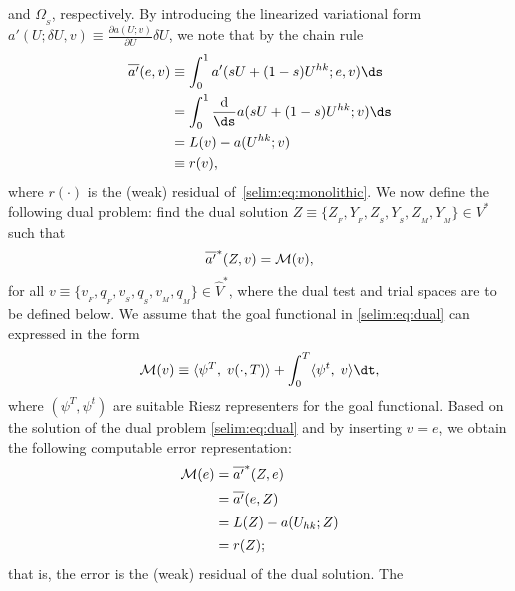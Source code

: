 and $\Omega_{_{S}}$, respectively. By introducing the linearized
variational form $a'(U; \delta U,v ) \equiv \frac{\partial
  a(U;v)}{\partial U}\delta U$, we note that by the chain rule
\begin{equation}
\begin{split}
\overline{a'}(e, v)  &\equiv \int_0^1 a'(sU + (1-s)U^{hk}; e,
v) \ds
\\
&= \int_0^1 \frac{\textrm{d}}{\ds} a (sU + (1-s)U^{hk}; v) \ds
\\
&= L(v) - a(U^{hk};v)
\\ &\equiv  r(v),
\end{split}
\end{equation}
where $r(\cdot)$ is the (weak) residual of~\eqref{selim:eq:monolithic}.
We now define the following dual problem: find the dual solution
$Z\equiv \{ Z_{_{F}}, Y_{_{F}}, Z_{_{S}}, Y_{_{S}}, Z_{_{M}},
Y_{_{M}}\}\in V^*$ such that\vspace*{2pt}
\begin{equation}
  \label{selim:eq:dual}
  \overline{a'}^{*}(Z, v) = \M(v),\vspace*{2pt}
\end{equation}
for all $v\equiv \{ v_{_{F}}, q_{_{F}}, v_{_{S}}, q_{_{S}}, v_{_{M}}, q_{_{M}}
\}\in\hat{V}^*$, where the dual test and trial spaces are to be
defined below. We assume that the goal functional in \eqref{selim:eq:dual} can
expressed in the form\vspace*{2pt}
\begin{equation}
\M(v)  \equiv \langle \psi^T,\;  v(\cdot, T) \rangle +
\int_0^T \langle \psi^t,\; v \rangle \dt,\vspace*{2pt}
\end{equation}
where $(\psi^T, \psi^t)$ are suitable Riesz representers for the
goal functional. Based on the solution of the dual
problem \eqref{selim:eq:dual} and by inserting $v=e$,
we obtain the following computable error representation:\vspace*{2pt}
\begin{equation}
\label{selim:eq:representation}
\begin{split}
\M(e) &= \overline{a'}^{*}(Z ,e)
\\[1.5pt]
&= \overline{a'}(e, Z)
\\[1.5pt]
&= L(Z) - a(U_{hk}; Z)
\\[1.5pt]
&= r(Z);
\end{split}\vspace*{2pt}
\end{equation}
that is, the error is the (weak) residual of the dual solution.  The
